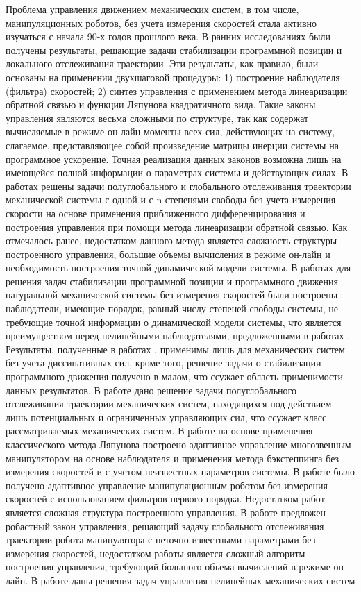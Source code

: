 {	Проблема управления движением механических систем, в том числе, манипуляционных роботов, без учета измерения скоростей стала активно изучаться с начала 90-х годов прошлого века. В ранних исследованиях \cite{nicosia90, berghuis91, kelly93, berghuis93_1, berghuis93_2} были получены результаты, решающие задачи стабилизации программной позиции и локального отслеживания траектории. Эти результаты, как правило, были основаны на применении двухшаговой процедуры: 1) построение наблюдателя (фильтра) скоростей; 2) синтез управления с применением метода линеаризации обратной связью и функции Ляпунова квадратичного вида. Такие законы управления являются весьма сложными по структуре, так как содержат вычисляемые в режиме он-лайн моменты всех сил, действующих на систему, слагаемое, представляющее собой произведение матрицы инерции системы на программное ускорение. Точная реализация данных законов возможна лишь на имеющейся полной информации о параметрах системы и действующих силах. В работах \cite{loria95, loria96} решены задачи полуглобального и глобального отслеживания траектории механической системы с одной и с n степенями свободы без учета измерения скорости на основе применения приближенного дифференцирования и построения управления при помощи метода линеаризации обратной связью. Как отмечалось ранее, недостатком данного метода является сложность структуры построенного управления, большие объемы вычисления в режиме он-лайн и необходимость построения точной динамической модели системы. В работах \cite{burkov95, burkov98} для решения задач стабилизации программной позиции и программного движения натуральной механической системы без измерения скоростей были построены наблюдатели, имеющие порядок, равный числу степеней свободы системы, не требующие точной информации о динамической модели системы, что является преимуществом перед нелинейными наблюдателями, предложенными в работах \cite{nicosia90, berghuis91}. Результаты, полученные в работах \cite{burkov95, burkov98}, применимы лишь для механических систем без учета диссипативных сил, кроме того, решение задачи о стабилизации программного движения получено в малом, что ссужает область применимости данных результатов. В работе \cite{loria98} дано решение задачи полуглобального отслеживания траектории механических систем, находящихся под действием лишь потенциальных и ограниченных управляющих сил, что ссужает класс рассматриваемых механических систем. В работе \cite{calugi02} на основе применения классического метода Ляпунова построено адаптивное управление многозвенным манипулятором на основе наблюдателя и применения метода бэкстеппинга без измерения скоростей и с учетом неизвестных параметров системы. В работе \cite{alonge03} было получено адаптивное управление манипуляционным роботом без измерения скоростей с использованием фильтров первого порядка. Недостатком работ \cite{calugi02, alonge03} является сложная структура построенного управления. В работе \cite{dixon04} предложен робастный закон управления, решающий задачу глобального отслеживания траектории робота манипулятора с неточно известными параметрами без измерения скоростей, недостатком работы является сложный алгоритм построения управления, требующий большого объема вычислений в режиме он-лайн. В работе \cite{nunes08} даны решения задач управления нелинейных механических систем }
